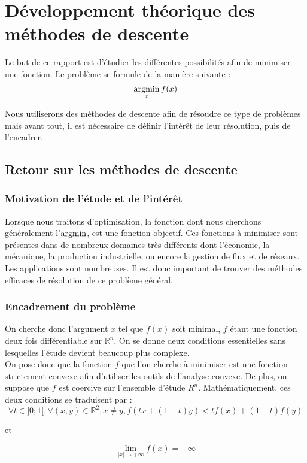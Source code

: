 \chapter{Développement théorique des méthodes de descente}

Le but de ce rapport est d'étudier les différentes possibilités afin de minimiser une fonction. Le problème se formule de la manière suivante : 
\begin{equation}
\argmin_x f(x)
\end{equation}

Nous utiliserons des méthodes de descente afin de résoudre ce type de problèmes mais avant tout, il est nécessaire de définir l'intérêt de leur résolution, puis de l'encadrer.

\section{Retour sur les méthodes de descente}
\subsection{Motivation de l'étude et de l'intérêt}
Lorsque nous traitons d'optimisation, la fonction dont nous cherchons généralement l'$\argmin$, est une fonction objectif. Ces fonctions à minimiser sont présentes dans de nombreux domaines très différents dont l'économie, la mécanique, la production industrielle, ou encore la gestion de flux et de réseaux. Les applications sont nombreuses. Il est donc important de trouver des méthodes efficaces de résolution de ce problème général. 
\subsection{Encadrement du problème}
On cherche donc l'argument $x$ tel que $f(x)$ soit minimal, $f$ étant une fonction deux fois différentiable sur $\mathbb{R}^n$. On se donne deux conditions essentielles sans lesquelles l'étude devient beaucoup plus complexe. \\

On pose donc que la fonction $f$ que l'on cherche à minimiser est une fonction strictement convexe afin d'utiliser les outils de l'analyse convexe. De plus, on suppose que $f$ est coercive sur l'ensemble d'étude $R^n$. Mathématiquement, ces deux conditions se traduisent par :
$$
\forall t \in ]0;1[, \forall (x,y) \in \mathbb{R}^2, x\neq y, f(tx+(1-t)y)<tf(x)+(1-t)f(y) 
$$
\begin{center}
	et
\end{center}
$$
\lim\limits_{|x|\rightarrow +\infty}f(x)=+\infty
$$

